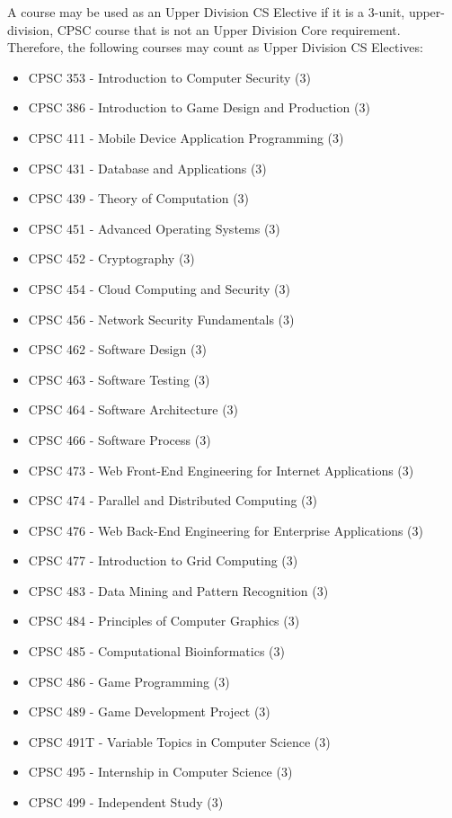\documentclass{book}
\begin{document}
A course may be used as an Upper Division CS Elective if it is a
3-unit, upper-division, CPSC course that is not an Upper Division Core
requirement. Therefore, the following courses may count as Upper
Division CS Electives:
\begin{itemize}
\item CPSC 353 - Introduction to Computer Security (3)
\item CPSC 386 - Introduction to Game Design and Production (3)
\item CPSC 411 - Mobile Device Application Programming (3)
\item CPSC 431 - Database and Applications (3)
\item CPSC 439 - Theory of Computation (3)
\item CPSC 451 - Advanced Operating Systems (3)
\item CPSC 452 - Cryptography (3)
\item CPSC 454 - Cloud Computing and Security (3)
\item CPSC 456 - Network Security Fundamentals (3)
\item CPSC 462 - Software Design (3)
\item CPSC 463 - Software Testing (3)
\item CPSC 464 - Software Architecture (3)
\item CPSC 466 - Software Process (3)
\item CPSC 473 - Web Front-End Engineering for Internet Applications (3)
\item CPSC 474 - Parallel and Distributed Computing (3)
\item CPSC 476 - Web Back-End Engineering for Enterprise Applications (3)
\item CPSC 477 - Introduction to Grid Computing (3)
\item CPSC 483 - Data Mining and Pattern Recognition (3)
\item CPSC 484 - Principles of Computer Graphics (3)
\item CPSC 485 - Computational Bioinformatics (3)
\item CPSC 486 - Game Programming (3)
\item CPSC 489 - Game Development Project (3)
\item CPSC 491T - Variable Topics in Computer Science (3)
\item CPSC 495 - Internship in Computer Science (3)
\item CPSC 499 - Independent Study (3)
\end{itemize}
\end{document}
